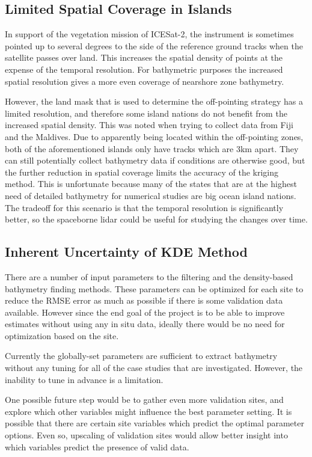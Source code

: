 \subsection{Limited Spatial Coverage in Islands}

In support of the vegetation mission of ICESat-2, the instrument is sometimes pointed up to several degrees to the side of the reference ground tracks when the satellite passes over land. This increases the spatial density of points at the expense of the temporal resolution. For bathymetric purposes the increased spatial resolution gives a more even  coverage of nearshore zone bathymetry. 

However, the land mask that is used to determine the off-pointing strategy has a limited resolution, and therefore some island nations do not benefit from the increased spatial density. This was noted when trying to collect data from Fiji and the Maldives. Due to apparently being located within the off-pointing zones, both of the aforementioned islands only have tracks which are 3km apart. They can still potentially collect bathymetry data if conditions are otherwise good, but the further reduction in spatial coverage limits the accuracy of the kriging method. This is unfortunate because many of the states that are at the highest need of detailed bathymetry for numerical studies are big ocean island nations. The tradeoff for this scenario is that the temporal resolution is significantly better, so the spaceborne lidar could be useful for studying the changes over time. 

\subsection{Inherent Uncertainty of KDE Method}
There are a number of input parameters to the filtering and the density-based bathymetry finding methods. These parameters can be optimized for each site to reduce the RMSE error as much as possible if there is some validation data available. However since the end goal of the project is to be able to improve estimates without using any in situ data, ideally there would be no need for optimization based on the site.

Currently the globally-set parameters are sufficient to extract bathymetry without any tuning for all of the case studies that are investigated. However, the inability to tune in advance is a limitation. 

One possible future step would be to gather even more validation sites, and explore which other variables might influence the best parameter setting. It is possible that there are certain site variables which predict the optimal parameter options. Even so, upscaling of validation sites would allow better insight into which variables predict the presence of valid data.  

